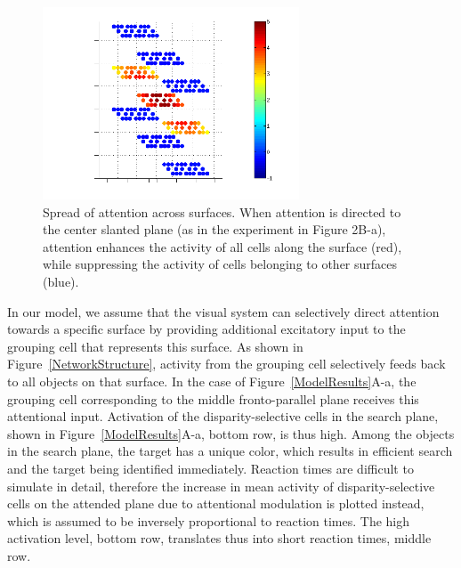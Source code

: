\documentclass[conference]{IEEEtran}
\begin{document}
\begin{figure}[h!]
\centering
\includegraphics[width=3in]{figs/attentionmod}
\caption{Spread of attention across surfaces. When attention is
  directed to the center slanted plane (as in the experiment in Figure
  2B-a), attention enhances the activity of all cells along the
  surface (red), while suppressing the activity of cells belonging to
  other surfaces (blue).} 
\vspace{-11pt}
\label{ModelResults2}
\end{figure}

In our model, we assume that the visual system can selectively direct
attention towards a specific surface 
by providing additional excitatory input to the grouping cell
that represents this surface. As shown in Figure~\ref{NetworkStructure},
activity from the grouping cell selectively feeds back to all
objects on that surface. In the case of Figure~\ref{ModelResults}A-a, the grouping cell corresponding to the middle fronto-parallel plane receives this attentional input. 
Activation of the disparity-selective cells in the search
plane, shown in Figure~\ref{ModelResults}A-a, bottom row, is thus
high. Among the objects in the
search plane, the target has a unique color, which results in
efficient search and the target being identified immediately. Reaction
times are difficult to simulate in detail, therefore 
the increase in mean activity of disparity-selective cells on the
attended plane due to attentional modulation is plotted instead,
which is assumed to be inversely proportional to reaction times. The
high activation level, bottom row, translates thus into short reaction
times, middle row.
\end{document}
